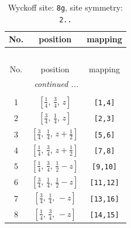 \documentclass[fleqn,8pt]{jsarticle}
\begin{document}
\renewcommand{\arraystretch}{1.2}
\begin{longtable}{ccc}
\caption{Wyckoff site: {\tt 8g}, site symmetry: {\tt 2..}}
 \\
 \hline \hline
No. & position & mapping \\ \hline \endfirsthead

\multicolumn{2}{l}{\tablename\ \thetable{}} \\
 \hline \hline
No. & position & mapping \\ \hline \endhead

 \hline \hline
\multicolumn{2}{r}{\footnotesize\it continued ...} \\ \endfoot

 \hline \hline
\multicolumn{2}{r}{} \\ \endlastfoot

1 & $\left[ \frac{1}{4},\, \frac{3}{4},\, z \right]$ & {\tt [1,4]} \\ \hline
2 & $\left[ \frac{3}{4},\, \frac{1}{4},\, z \right]$ & {\tt [2,3]} \\ \hline
3 & $\left[ \frac{3}{4},\, \frac{1}{4},\, z + \frac{1}{2} \right]$ & {\tt [5,6]} \\ \hline
4 & $\left[ \frac{1}{4},\, \frac{3}{4},\, z + \frac{1}{2} \right]$ & {\tt [7,8]} \\ \hline
5 & $\left[ \frac{1}{4},\, \frac{3}{4},\, \frac{1}{2} - z \right]$ & {\tt [9,10]} \\ \hline
6 & $\left[ \frac{3}{4},\, \frac{1}{4},\, \frac{1}{2} - z \right]$ & {\tt [11,12]} \\ \hline
7 & $\left[ \frac{3}{4},\, \frac{1}{4},\, - z \right]$ & {\tt [13,16]} \\ \hline
8 & $\left[ \frac{1}{4},\, \frac{3}{4},\, - z \right]$ & {\tt [14,15]} \\
\end{longtable}
\renewcommand{\arraystretch}{1.2}
\end{document}
